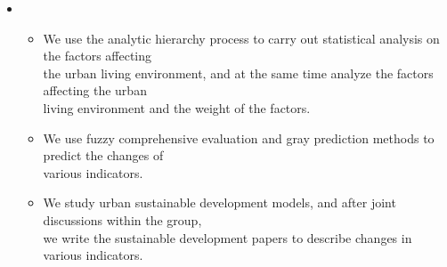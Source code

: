   \begin{itemize}[leftmargin=*]
    \item
      {\small
      \begin{itemize}
      \item We use the analytic hierarchy process to carry out statistical analysis on the factors affecting \\the urban living environment, and at the same time analyze the factors affecting the urban \\living environment and the weight of the factors.
        \item We use fuzzy comprehensive evaluation and gray prediction methods to predict the changes of \\various indicators.
        \item We study urban sustainable development models, and after joint discussions within the group, \\we write the sustainable development papers to describe changes in various indicators.
      \end{itemize}
      }
    

\end{itemize}
